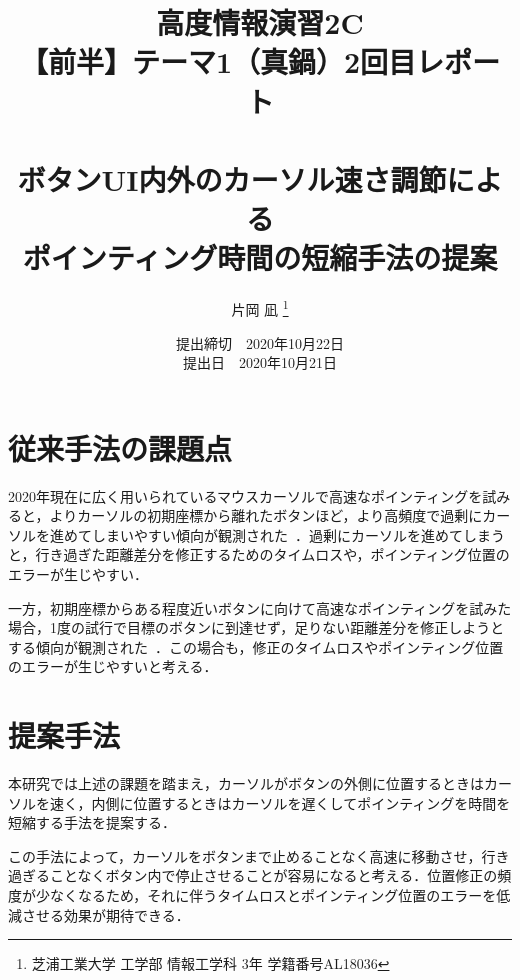 \documentclass[a4paper, papersize, titlepage]{jsarticle}
\title{高度情報演習2C \\
【前半】テーマ1（真鍋）2回目レポート \\
~\\
ボタンUI内外のカーソル速さ調節による \\
ポインティング時間の短縮手法の提案
}
\author{片岡 凪 \thanks{芝浦工業大学 工学部 情報工学科 3年 学籍番号AL18036}}
\date{提出締切　2020年10月22日 \\
提出日　2020年10月21日}
\begin{document}
\maketitle
\setcounter{tocdepth}{3}
\tableofcontents

\newpage
{}

\begin{multicols}{2}

\section{従来手法の課題点}
2020年現在に広く用いられているマウスカーソルで高速なポインティングを試みると，よりカーソルの初期座標から離れたボタンほど，より高頻度で過剰にカーソルを進めてしまいやすい傾向が観測された~\cite{report_1}．過剰にカーソルを進めてしまうと，行き過ぎた距離差分を修正するためのタイムロスや，ポインティング位置のエラーが生じやすい．

一方，初期座標からある程度近いボタンに向けて高速なポインティングを試みた場合，1度の試行で目標のボタンに到達せず，足りない距離差分を修正しようとする傾向が観測された~\cite{report_1}．この場合も，修正のタイムロスやポインティング位置のエラーが生じやすいと考える．


\section{提案手法}
本研究では上述の課題を踏まえ，カーソルがボタンの外側に位置するときはカーソルを速く，内側に位置するときはカーソルを遅くしてポインティングを時間を短縮する手法を提案する．

この手法によって，カーソルをボタンまで止めることなく高速に移動させ，行き過ぎることなくボタン内で停止させることが容易になると考える．位置修正の頻度が少なくなるため，それに伴うタイムロスとポインティング位置のエラーを低減させる効果が期待できる．



\end{multicols}
\end{document}
